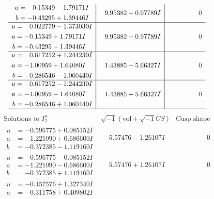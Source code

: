\documentclass[1p]{elsarticle_modified}
\theoremstyle{definition}
\newcommand{\I}{\sqrt{-1}}
\begin{document}
$$\begin{array}{c|c|c}
\begin{aligned}
a &= -0.15349 - 1.79171 I \\
b &= -0.43295 + 1.39446 I\end{aligned}
 & \phantom{-}9.95382 - 0.97789 I & \phantom{-0.000000 } 0 \\ \hline\begin{aligned}
u &= \phantom{-}0.022779 - 1.373030 I \\
a &= -0.15349 + 1.79171 I \\
b &= -0.43295 - 1.39446 I\end{aligned}
 & \phantom{-}9.95382 + 0.97789 I & \phantom{-0.000000 } 0 \\ \hline\begin{aligned}
u &= \phantom{-}0.617252 + 1.244230 I \\
a &= -1.00959 + 1.64080 I \\
b &= -0.286546 - 1.060440 I\end{aligned}
 & \phantom{-}1.43885 - 5.66327 I & \phantom{-0.000000 } 0 \\ \hline\begin{aligned}
u &= \phantom{-}0.617252 - 1.244230 I \\
a &= -1.00959 - 1.64080 I \\
b &= -0.286546 + 1.060440 I\end{aligned}
 & \phantom{-}1.43885 + 5.66327 I & \phantom{-0.000000 } 0\\
 \hline 
 \end{array}$$\newpage$$\begin{array}{c|c|c}  
\text{Solutions to }I^u_{2}& \I (\text{vol} + \sqrt{-1}CS) & \text{Cusp shape}\\
 \hline 
\begin{aligned}
u &= -0.596775 + 0.085152 I \\
a &= -1.221090 + 0.686600 I \\
b &= -0.372385 - 1.119160 I\end{aligned}
 & \phantom{-}5.57476 - 1.26107 I & \phantom{-0.000000 } 0 \\ \hline\begin{aligned}
u &= -0.596775 - 0.085152 I \\
a &= -1.221090 - 0.686600 I \\
b &= -0.372385 + 1.119160 I\end{aligned}
 & \phantom{-}5.57476 + 1.26107 I & \phantom{-0.000000 } 0 \\ \hline\begin{aligned}
u &= -0.457576 + 1.327340 I \\
a &= -0.311758 + 0.409802 I \\

\end{aligned}
\end{array}$$
\end{document}
